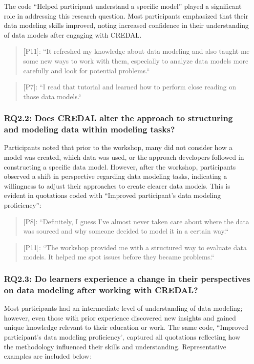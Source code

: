 The code ``Helped participant understand a specific model'' played a significant role in addressing this research question. Most participants emphasized that their data modeling skills improved, noting increased confidence in their understanding of data models after engaging with CREDAL.
\begin{quote}
    \textbf[P11]: ``It refreshed my knowledge about data modeling and also taught me some new ways to work with them, especially to analyze data models more carefully and look for potential problems.``
\end{quote}
\begin{quote}
      \textbf[P7]: ``I read that tutorial and learned how to perform close reading on those data models.``
\end{quote}

\subsubsection{\textbf{RQ2.2}: Does CREDAL alter the approach to structuring and modeling data within modeling tasks?}

Participants noted that prior to the workshop, many did not consider how a model was created, which data was used, or the approach developers followed in constructing a specific data model. However, after the workshop, participants observed a shift in perspective regarding data modeling tasks, indicating a willingness to adjust their approaches to create clearer data models. This is evident in quotations coded with ``Improved participant's data modeling proficiency'': 

\begin{quote}
      \textbf[P8]: ``Definitely, I guess I’ve almost never taken care about where the data was sourced and why someone decided to model it in a certain way.``
\end{quote}
\begin{quote}
      \textbf[P11]: ``The workshop provided me with a structured way to evaluate data models. It helped me spot issues before they became problems.``
\end{quote}

\subsubsection{\textbf{RQ2.3}: Do learners experience a change in their perspectives on data modeling after working with CREDAL?}

Most participants had an intermediate level of understanding of data modeling; however, even those with prior experience discovered new insights and gained unique knowledge relevant to their education or work. The same code, ``Improved participant's data modeling proficiency', captured all quotations reflecting how the methodology influenced their skills and understanding.  Representative examples are included below:

